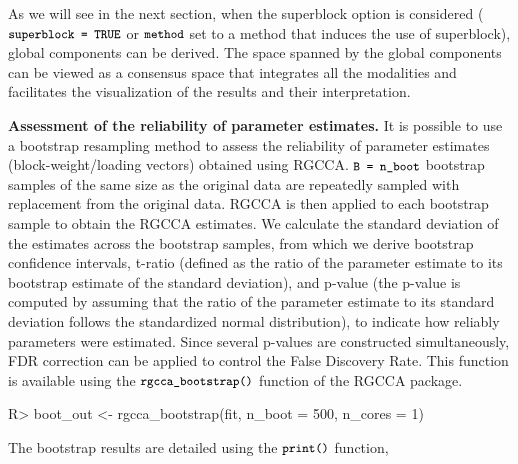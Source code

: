 \documentclass[
]{jss}
\begin{document}
\normalsize

As we will see in the next section, when the superblock option is
considered (\(\small{\texttt{superblock = TRUE}}\) or
\(\small{\texttt{method}}\) set to a method that induces the use of
superblock), global components can be derived. The space spanned by the
global components can be viewed as a consensus space that integrates all
the modalities and facilitates the visualization of the results and
their interpretation.

\textbf{Assessment of the reliability of parameter estimates.} It is
possible to use a bootstrap resampling method to assess the reliability
of parameter estimates (block-weight/loading vectors) obtained using
RGCCA. \(\small{\texttt{B = n\_boot}}\) bootstrap samples of the same
size as the original data are repeatedly sampled with replacement from
the original data. RGCCA is then applied to each bootstrap sample to
obtain the RGCCA estimates. We calculate the standard deviation of the
estimates across the bootstrap samples, from which we derive bootstrap
confidence intervals, t-ratio (defined as the ratio of the parameter
estimate to its bootstrap estimate of the standard deviation), and
p-value (the p-value is computed by assuming that the ratio of the
parameter estimate to its standard deviation follows the standardized
normal distribution), to indicate how reliably parameters were
estimated. Since several p-values are constructed simultaneously, FDR
correction can be applied to control the False Discovery Rate. This
function is available using the \(\small{\texttt{rgcca\_bootstrap()}}\)
function of the RGCCA package.

\footnotesize

\begin{CodeChunk}
\begin{CodeInput}
R> boot_out <- rgcca_bootstrap(fit, n_boot = 500, n_cores = 1)
\end{CodeInput}
\end{CodeChunk}

\normalsize

The bootstrap results are detailed using the
\(\small{\texttt{print()}}\) function,

\footnotesize
\end{document}
